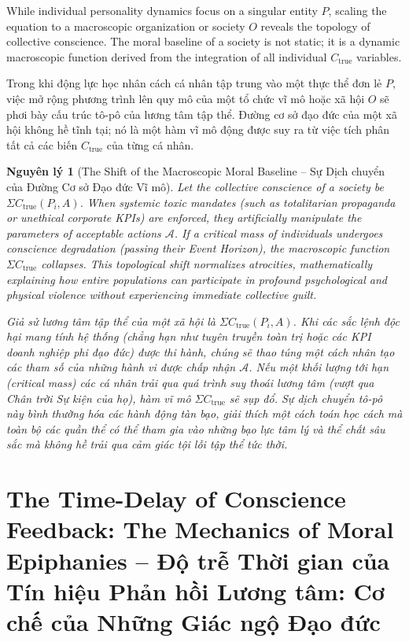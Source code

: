 \documentclass{report}
\newtheorem{nguyenly}{Nguyên lý}
\begin{document}
While individual personality dynamics focus on a singular entity $P$, scaling the equation to a macroscopic organization or society $O$ reveals the topology of collective conscience. The moral baseline of a society is not static; it is a dynamic macroscopic function derived from the integration of all individual $C_{\text{true}}$ variables.

Trong khi động lực học nhân cách cá nhân tập trung vào một thực thể đơn lẻ $P$, việc mở rộng phương trình lên quy mô của một tổ chức vĩ mô hoặc xã hội $O$ sẽ phơi bày cấu trúc tô-pô của lương tâm tập thể. Đường cơ sở đạo đức của một xã hội không hề tĩnh tại; nó là một hàm vĩ mô động được suy ra từ việc tích phân tất cả các biến $C_{\text{true}}$ của từng cá nhân.

\begin{nguyenly}[The Shift of the Macroscopic Moral Baseline -- Sự Dịch chuyển của Đường Cơ sở Đạo đức Vĩ mô]
	Let the collective conscience of a society be $\Sigma C_{\text{true}}(P_i, A)$. When systemic toxic mandates (such as totalitarian propaganda or unethical corporate KPIs) are enforced, they artificially manipulate the parameters of acceptable actions $\mathcal{A}$. If a critical mass of individuals undergoes conscience degradation (passing their Event Horizon), the macroscopic function $\Sigma C_{\text{true}}$ collapses. This topological shift normalizes atrocities, mathematically explaining how entire populations can participate in profound psychological and physical violence without experiencing immediate collective guilt.
	
	Giả sử lương tâm tập thể của một xã hội là $\Sigma C_{\text{true}}(P_i, A)$. Khi các sắc lệnh độc hại mang tính hệ thống (chẳng hạn như tuyên truyền toàn trị hoặc các KPI doanh nghiệp phi đạo đức) được thi hành, chúng sẽ thao túng một cách nhân tạo các tham số của những hành vi được chấp nhận $\mathcal{A}$. Nếu một khối lượng tới hạn (critical mass) các cá nhân trải qua quá trình suy thoái lương tâm (vượt qua Chân trời Sự kiện của họ), hàm vĩ mô $\Sigma C_{\text{true}}$ sẽ sụp đổ. Sự dịch chuyển tô-pô này bình thường hóa các hành động tàn bạo, giải thích một cách toán học cách mà toàn bộ các quần thể có thể tham gia vào những bạo lực tâm lý và thể chất sâu sắc mà không hề trải qua cảm giác tội lỗi tập thể tức thời.
\end{nguyenly}

\section{The Time-Delay of Conscience Feedback: The Mechanics of Moral Epiphanies -- Độ trễ Thời gian của Tín hiệu Phản hồi Lương tâm: Cơ chế của Những Giác ngộ Đạo đức}
\end{document}
